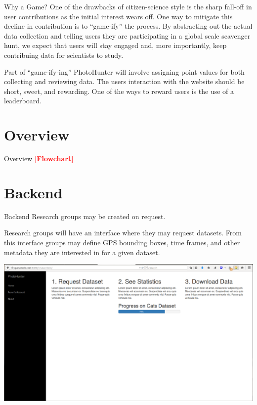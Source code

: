 \documentclass[aspectratio=169]{beamer}
\newcommand{\todo}[1]{\textcolor{red}{\textbf{[#1]}}}
\begin{document}
\begin{frame}{Why a Game?}
  One of the drawbacks of citizen-science style is the sharp fall-off
  in
  user contributions as the initial interest wears off. One way to
  mitigate this decline in contribution is to ``game-ify'' the
  process.
  By abstracting out the actual data collection and telling users they
  are participating in a global scale scavenger hunt, we expect that
  users will stay engaged and, more importantly, keep contribuing data
  for scientists to study.

  Part of ``game-ify-ing'' PhotoHunter will involve assigning point
  values for both collecting and reviewing data. The users interaction
  with the website should be short, sweet, and rewarding. One of the
  ways to reward users is the use of a leaderboard.
\end{frame}

\section{Overview}

\begin{frame}{Overview}
  \todo{Flowchart}
\end{frame}

\section{Backend}

\begin{frame}{Backend}
  Research groups may be created on request. 

  Research groups will have an interface where they may request
  datasets. From this interface groups may define GPS bounding boxes,
  time frames, and other metadata they are interested in for a given
  dataset.
\end{frame}

\begin{frame}
  \includegraphics[width=\columnwidth]{researchers}
\end{frame}
\end{document}

